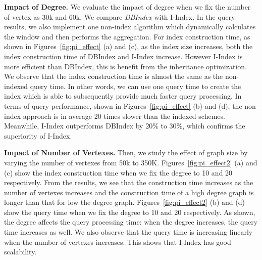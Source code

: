 \textbf{Impact of Degree.} We evaluate the impact of degree when we fix the number of vertex as 30k and 60k.  
We compare \emph{DBIndex} with I-Index. 
In the query results, we also implement one non-index algorithm 
which dynamically calculates the window and then performs the aggregation. 
For index construction time, as shown in Figures~\ref{fig:pi_effect} (a) and (c), as the 
index size increases, both the index construction time of 
DBIndex and I-Index increase. However I-Index is more efficient than 
DBIndex, this is benefit from the inheritance optimization.  We observe that the 
index construction time is almost the same as the non-indexed query time. In other words, 
we can use one query time to create the index which is able to subsequently provide much faster query processing. 
In terms of query performance, shown in Figures~\ref{fig:pi_effect} (b) and (d), the non-index approach is in average 20 times slower than 
the indexed schemes. Meanwhile, I-Index outperforms DBIndex by 20\% to 30\%, which confirms the superiority of I-Index.

\textbf{Impact of Number of Vertexes.} Then, we study 
the effect of graph size by varying the number of vertexes from 50k to 350K.
Figures~\ref{fig:pi_effect2} (a) and (c) show the index construction time when we fix the degree to 
10 and 20 respectively. From the results, we see that the construction time increases as the number of vertexes increases and the construction time of a high degree graph is longer than that for low the degree graph. Figures~\ref{fig:pi_effect2} (b) and (d) show the query time when we fix the degree to 10 and 20 respectively. 
As shown, the degree affects the query processing time: when the degree increases, the query time increases as well. We also observe that the query time is increasing linearly when the number of vertexes increases. This shows that I-Index has good scalability.
  
